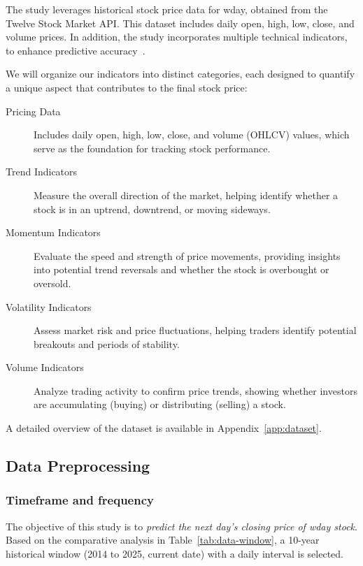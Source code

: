 The study leverages historical stock price data for \acrshort{wday}, obtained from the
Twelve Stock Market API. This dataset includes daily open, high, low, close, and volume prices. In
addition, the study incorporates multiple technical indicators, to
enhance predictive accuracy~\parencite{parmar2018stock, nabipour2020DeepLearning,
guo2024LSTMStock}. 

We will organize our indicators into distinct categories, each designed to quantify a unique aspect that contributes to the final stock price:

\begin{description}
    \item[Pricing Data] Includes daily open, high, low, close, and volume (OHLCV) values,
    which serve as the foundation for tracking stock performance.
    \item[Trend Indicators] Measure the overall direction of the market, helping identify 
    whether a stock is in an uptrend, downtrend, or moving sideways.
    \item[Momentum Indicators] Evaluate the speed and strength of price movements, providing
    insights into potential trend reversals and whether the stock is overbought or oversold.
    \item[Volatility Indicators] Assess market risk and price fluctuations, helping traders 
    identify potential breakouts and periods of stability.
    \item[Volume Indicators] Analyze trading activity to confirm price trends, showing
    whether investors are accumulating (buying) or distributing (selling) a stock.
\end{description}

A detailed overview of the dataset is available in Appendix~\ref{app:dataset}.

\subsection{Data Preprocessing}

\subsubsection{Timeframe and frequency}

The objective of this study is to \emph{predict the next day’s closing
price of \acrfull{wday} stock}. Based on the comparative analysis in 
Table~\ref{tab:data-window}, a 10-year historical window (2014 to 2025, current date) with a daily 
interval is selected. 


